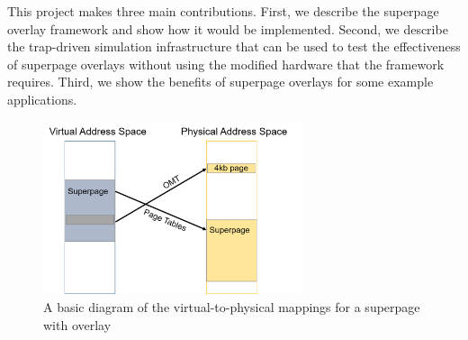 This project makes three main contributions. First, we describe the superpage overlay framework and show how it would be implemented. Second, we describe the trap-driven simulation infrastructure that can be used to test the effectiveness of superpage overlays without using the modified hardware that the framework requires. Third, we show the benefits of superpage overlays for some example applications.

\begin{figure}
    \centering
    \includegraphics[width=3in]{Figures/Picture1}
    \caption{A basic diagram of the virtual-to-physical mappings for a superpage with overlay}
    \label{fig:basic}
\end{figure}
